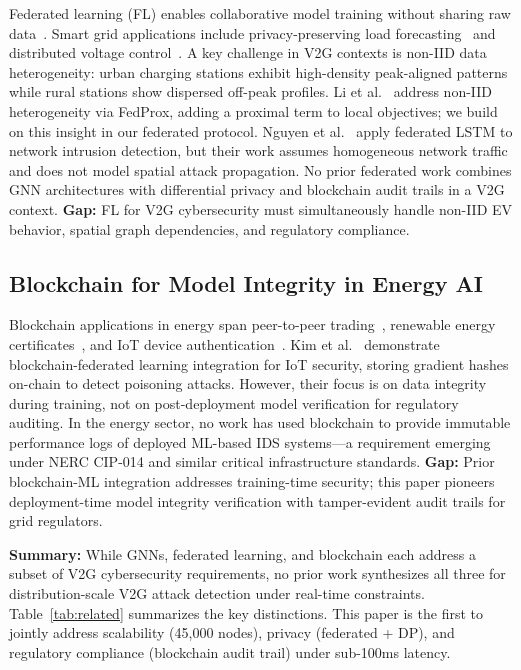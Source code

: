 \documentclass[journal]{IEEEtran}
\begin{document}
Federated learning (FL) enables collaborative model training without sharing raw data~\cite{mcmahan2017}. Smart grid applications include privacy-preserving load forecasting~\cite{fl_load,zhang_fl} and distributed voltage control~\cite{fl_voltage}. A key challenge in V2G contexts is non-IID data heterogeneity: urban charging stations exhibit high-density peak-aligned patterns while rural stations show dispersed off-peak profiles. Li et al.~\cite{fedprox} address non-IID heterogeneity via FedProx, adding a proximal term to local objectives; we build on this insight in our federated protocol. Nguyen et al.~\cite{nguyen_fl_ids} apply federated LSTM to network intrusion detection, but their work assumes homogeneous network traffic and does not model spatial attack propagation. No prior federated work combines GNN architectures with differential privacy and blockchain audit trails in a V2G context. \textbf{Gap:} FL for V2G cybersecurity must simultaneously handle non-IID EV behavior, spatial graph dependencies, and regulatory compliance.

\subsection{Blockchain for Model Integrity in Energy AI}

Blockchain applications in energy span peer-to-peer trading~\cite{bc_trading}, renewable energy certificates~\cite{bc_rec}, and IoT device authentication~\cite{bc_iot}. Kim et al.~\cite{kim_bc_fl} demonstrate blockchain-federated learning integration for IoT security, storing gradient hashes on-chain to detect poisoning attacks. However, their focus is on data integrity during training, not on post-deployment model verification for regulatory auditing. In the energy sector, no work has used blockchain to provide immutable performance logs of deployed ML-based IDS systems—a requirement emerging under NERC CIP-014 and similar critical infrastructure standards. \textbf{Gap:} Prior blockchain-ML integration addresses training-time security; this paper pioneers deployment-time model integrity verification with tamper-evident audit trails for grid regulators.

\textbf{Summary:} While GNNs, federated learning, and blockchain each address a subset of V2G cybersecurity requirements, no prior work synthesizes all three for distribution-scale V2G attack detection under real-time constraints. Table~\ref{tab:related} summarizes the key distinctions. This paper is the first to jointly address scalability (45,000 nodes), privacy (federated + DP), and regulatory compliance (blockchain audit trail) under sub-100ms latency.
\end{document}
